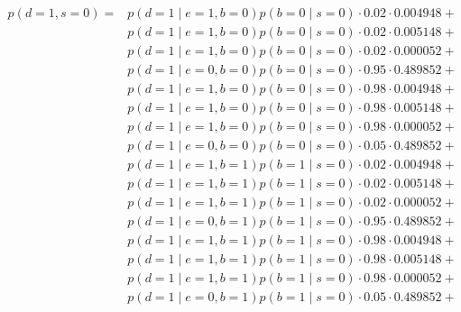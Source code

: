 \documentclass[12pt]{report}
\begin{document}
\begin{align*}    
    p(d=1,s=0) = 
    &p(d=1\mid e=1,b=0)p(b=0\mid s=0) \cdot  0.02 \cdot 0.004948 + \\
    &p(d=1\mid e=1,b=0)p(b=0\mid s=0) \cdot  0.02 \cdot 0.005148 + \\
    &p(d=1\mid e=1,b=0)p(b=0\mid s=0) \cdot  0.02 \cdot 0.000052 + \\
    &p(d=1\mid e=0,b=0)p(b=0\mid s=0) \cdot  0.95 \cdot 0.489852 + \\
    &p(d=1\mid e=1,b=0)p(b=0\mid s=0) \cdot  0.98 \cdot 0.004948 + \\
    &p(d=1\mid e=1,b=0)p(b=0\mid s=0) \cdot  0.98 \cdot 0.005148 + \\
    &p(d=1\mid e=1,b=0)p(b=0\mid s=0) \cdot  0.98 \cdot 0.000052 + \\
    &p(d=1\mid e=0,b=0)p(b=0\mid s=0) \cdot  0.05 \cdot 0.489852 + \\ 
    &p(d=1\mid e=1,b=1)p(b=1\mid s=0) \cdot  0.02 \cdot 0.004948 + \\
    &p(d=1\mid e=1,b=1)p(b=1\mid s=0) \cdot  0.02 \cdot 0.005148 + \\
    &p(d=1\mid e=1,b=1)p(b=1\mid s=0) \cdot  0.02 \cdot 0.000052 + \\
    &p(d=1\mid e=0,b=1)p(b=1\mid s=0) \cdot  0.95 \cdot 0.489852 + \\
    &p(d=1\mid e=1,b=1)p(b=1\mid s=0) \cdot  0.98 \cdot 0.004948 + \\
    &p(d=1\mid e=1,b=1)p(b=1\mid s=0) \cdot  0.98 \cdot 0.005148 + \\
    &p(d=1\mid e=1,b=1)p(b=1\mid s=0) \cdot  0.98 \cdot 0.000052 + \\
    &p(d=1\mid e=0,b=1)p(b=1\mid s=0) \cdot  0.05 \cdot 0.489852 + 
\end{align*}
\end{document}
